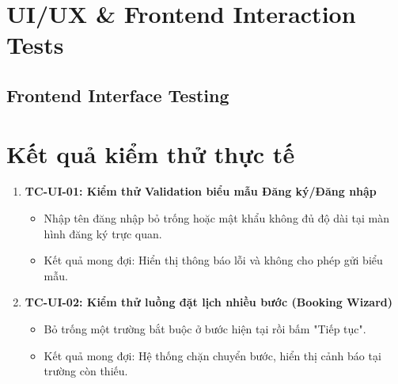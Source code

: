 \section{UI/UX \& Frontend Interaction Tests}

\subsection{Frontend Interface Testing}
\section{Kết quả kiểm thử thực tế}
\begin{enumerate}
    \item \textbf{TC-UI-01: Kiểm thử Validation biểu mẫu Đăng ký/Đăng nhập}
    \begin{itemize}
        \item Nhập tên đăng nhập bỏ trống hoặc mật khẩu không đủ độ dài tại màn hình đăng ký trực quan.
        \item Kết quả mong đợi: Hiển thị thông báo lỗi và không cho phép gửi biểu mẫu.
    \end{itemize}

    \item \textbf{TC-UI-02: Kiểm thử luồng đặt lịch nhiều bước (Booking Wizard)}
    \begin{itemize}
        \item Bỏ trống một trường bắt buộc ở bước hiện tại rồi bấm "Tiếp tục".
        \item Kết quả mong đợi: Hệ thống chặn chuyển bước, hiển thị cảnh báo tại trường còn thiếu.
    \end{itemize}
\end{enumerate}